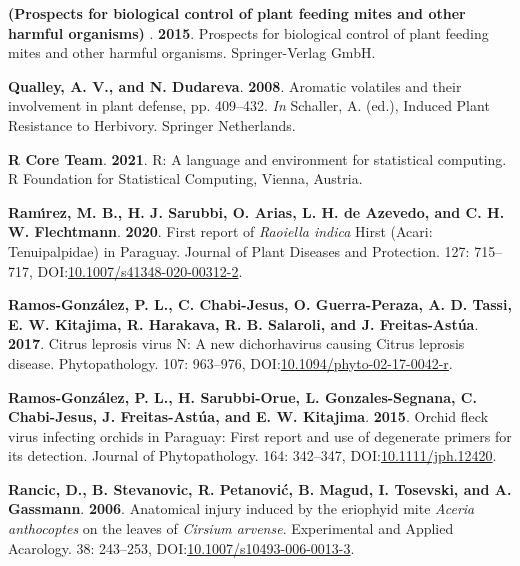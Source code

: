 \documentclass[12pt,final,CPage]{ufthesis}
\newlength{\cslhangindent}
\newenvironment{CSLReferences}[2] %
{%
	\setlength{\parindent}{0pt}
	\ifodd #1 \everypar{\setlength{\hangindent}{\cslhangindent}}\ignorespaces\fi
	\ifnum #2 > 0
	\setlength{\parskip}{#2\baselineskip}
	\fi
}%
{}
\begin{document}
{\begin{CSLReferences}{1}{0}
  \leavevmode{}%
  \textbf{(Prospects for biological control of plant feeding mites and other harmful organisms) }. \textbf{2015}. Prospects for biological control of plant feeding mites and other harmful organisms. Springer-Verlag GmbH.

  \leavevmode{}%
  \textbf{Qualley, A. V., and N. Dudareva}. \textbf{2008}. Aromatic volatiles and their involvement in plant defense, pp. 409--432. \emph{In} Schaller, A. (ed.), Induced Plant Resistance to Herbivory. Springer Netherlands.

  \leavevmode{}%
  \textbf{R Core Team}. \textbf{2021}. R: A language and environment for statistical computing. R Foundation for Statistical Computing, Vienna, Austria.

  \leavevmode{}%
  \textbf{Ramı́rez, M. B., H. J. Sarubbi, O. Arias, L. H. de Azevedo, and C. H. W. Flechtmann}. \textbf{2020}. First report of {\emph{Raoiella indica}} {Hirst} ({Acari}: {Tenuipalpidae}) in {Paraguay}. Journal of Plant Diseases and Protection. 127: 715--717, DOI:\href{https://doi.org/10.1007/s41348-020-00312-2}{10.1007/s41348-020-00312-2}.

  \leavevmode{}%
  \textbf{Ramos-González, P. L., C. Chabi-Jesus, O. Guerra-Peraza, A. D. Tassi, E. W. Kitajima, R. Harakava, R. B. Salaroli, and J. Freitas-Astúa}. \textbf{2017}. {Citrus leprosis virus} {N}: A new dichorhavirus causing {Citrus leprosis} disease. Phytopathology{\textregistered}. 107: 963--976, DOI:\href{https://doi.org/10.1094/phyto-02-17-0042-r}{10.1094/phyto-02-17-0042-r}.

  \leavevmode{}%
  \textbf{Ramos-González, P. L., H. Sarubbi-Orue, L. Gonzales-Segnana, C. Chabi-Jesus, J. Freitas-Astúa, and E. W. Kitajima}. \textbf{2015}. {Orchid fleck virus} infecting orchids in {Paraguay}: First report and use of degenerate primers for its detection. Journal of Phytopathology. 164: 342--347, DOI:\href{https://doi.org/10.1111/jph.12420}{10.1111/jph.12420}.

  \leavevmode{}%
  \textbf{Rancic, D., B. Stevanovic, R. Petanović, B. Magud, I. Tosevski, and A. Gassmann}. \textbf{2006}. Anatomical injury induced by the eriophyid mite {\emph{Aceria anthocoptes}} on the leaves of {\emph{Cirsium arvense}}. Experimental and Applied Acarology. 38: 243--253, DOI:\href{https://doi.org/10.1007/s10493-006-0013-3}{10.1007/s10493-006-0013-3}.


\end{CSLReferences}}
\end{document}
